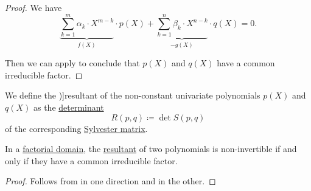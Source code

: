 \begin{proof}
  We have
  \begin{equation*}
    \underbrace{\sum_{k=1}^m \alpha_k \cdot X^{m-k}}_{f(X)} \cdot p(X)
    +
    \underbrace{\sum_{k=1}^n \beta_k \cdot X^{n-k}}_{-g(X)} \cdot q(X)
    =
    0.
  \end{equation*}

  Then we can apply  to conclude that \( p(X) \) and \( q(X) \) have a common irreducible factor.
\end{proof}

\begin{definition}\label{def:resultant}
  We define the \term[ru=результанта, en=resultant (\cite[def. 3.6.2]{CoxLittleOShea2015AlgGeometry})]{resultant} of the non-constant univariate polynomials \( p(X) \) and \( q(X) \) as the \hyperref[def:determinant]{determinant}
  \begin{equation*}
    R(p, q) \coloneqq \det S(p, q)
  \end{equation*}
  of the corresponding \hyperref[def:sylvester_matrix]{Sylvester matrix}.
\end{definition}

\begin{proposition}\label{thm:resultant_invertibility}
  In a \hyperref[def:factorial_domain]{factorial domain}, the \hyperref[def:resultant]{resultant} of two polynomials is non-invertible if and only if they have a common irreducible factor.
\end{proposition}
\begin{proof}
  Follows from  in one direction and  in the other.
\end{proof}

